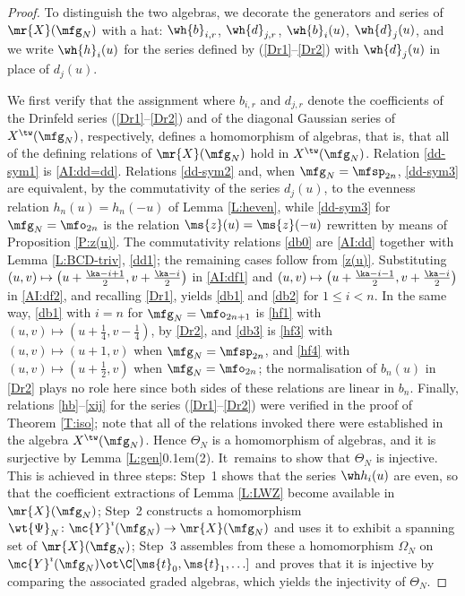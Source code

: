 \documentclass{amsart}
\numberwithin{equation}{section}
\theoremstyle{remark}
\renewcommand{\,}{\kern 0.1em} %
\begin{document}
\begin{proof}
%
To distinguish the two algebras, we decorate the generators and series of $\mr{X}(\mfg_N)$ with a hat: $\wh{b}_{i,r}$, $\wh{d}_{j,r}$, $\wh{b}_i(u)$, $\wh{d}_j(u)$, and we write $\wh{h}_i(u)$ for the series defined by (\ref{Dr1}--\ref{Dr2}) with $\wh{d}_j(u)$ in place of ${d}_j(u)$.

We first verify that the assignment
%
%
where $b_{i,r}$ and $d_{j,r}$ denote the coefficients of the Drinfeld series (\ref{Dr1}--\ref{Dr2}) and of the diagonal Gaussian series of $X^\tw(\mfg_N)$, respectively, defines a homomorphism of algebras, that is, that all of the defining relations of $\mr{X}(\mfg_N)$ hold in $X^\tw(\mfg_N)$. Relation \eqref{dd-sym1} is \eqref{AI:dd=dd}. Relations \eqref{dd-sym2} and, when $\mfg_N = \mfsp_{2n}$, \eqref{dd-sym3} are equivalent, by the commutativity of the series $d_j(u)$, to the evenness relation $h_n(u) = h_n(-u)$ of Lemma \ref{L:heven}, while \eqref{dd-sym3} for $\mfg_N=\mfo_{2n}$ is the relation $\ms{z}(u)=\ms{z}(-u)$ rewritten by means of Proposition \ref{P:z(u)}. The commutativity relations \eqref{db0} are \eqref{AI:dd} together with Lemma \ref{L:BCD-triv}, \eqref{dd1}; the remaining cases follow from \eqref{z(u)}. Substituting $(u,v)\mapsto \big(u+\tfrac{\ka-i+1}{2}, v+\tfrac{\ka-i}{2}\big)$ in \eqref{AI:df1} and $(u,v) \mapsto \big(u+\tfrac{\ka-i-1}{2}, v+\tfrac{\ka-i}{2}\big)$ in \eqref{AI:df2}, and recalling \eqref{Dr1}, yields \eqref{db1} and \eqref{db2} for $1\le i <n$. In the same way, \eqref{db1} with $i=n$ for $\mfg_N = \mfo_{2n+1}$ is \eqref{hf1} with $(u,v)\mapsto(u+\tfrac14, v-\tfrac14)$, by \eqref{Dr2}, and \eqref{db3} is \eqref{hf3} with $(u,v)\mapsto(u+1,v)$ when $\mfg_N = \mfsp_{2n}$, and \eqref{hf4} with $(u,v)\mapsto(u+\tfrac12,v)$ when $\mfg_N=\mfo_{2n}$; the normalisation of $b_n(u)$ in \eqref{Dr2} plays no role here since both sides of these relations are linear in $b_n$. Finally, relations \eqref{hb}--\eqref{xij} for the series (\ref{Dr1}--\ref{Dr2}) were verified in the proof of Theorem \ref{T:iso}; note that all of the relations invoked there were established in the algebra $X^\tw(\mfg_N)$. Hence $\Theta_N$ is a homomorphism of algebras, and it is surjective by Lemma \ref{L:gen}\,(2). It~remains to show that $\Theta_N$ is injective. 
This is achieved in three steps: Step~1 shows that the series $\wh h_i(u)$ are even, so that the coefficient extractions of Lemma \ref{L:LWZ} become available in $\mr{X}(\mfg_N)$; Step~2 constructs a homomorphism $\wt{\Psi}_N \colon \mc{Y}^{\imath}(\mfg_N) \to \mr{X}(\mfg_N)$ and uses it to exhibit a spanning set of $\mr{X}(\mfg_N)$; Step~3 assembles from these a homomorphism $\Omega_N$ on $\mc{Y}^{\imath}(\mfg_N) \ot \C[\ms{t}_0, \ms{t}_1, \ldots]$ and proves that it is injective by comparing the associated graded algebras, which yields the injectivity of $\Theta_N$.


\end{proof}
\end{document}
